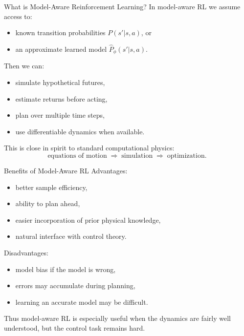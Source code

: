 \documentclass[aspectratio=169]{beamer}
\begin{document}
\begin{frame}{What is Model-Aware Reinforcement Learning?}
  In model-aware RL we assume access to:
  \begin{itemize}
  \item known transition probabilities $P(s'|s,a)$, or
  \item an approximate learned model $\hat P_\phi(s'|s,a)$.
  \end{itemize}

  Then we can:
  \begin{itemize}
  \item simulate hypothetical futures,
  \item estimate returns before acting,
  \item plan over multiple time steps,
  \item use differentiable dynamics when available.
  \end{itemize}

  This is close in spirit to standard computational physics:
  \[
  \text{equations of motion} \;\Rightarrow\; \text{simulation} \;\Rightarrow\; \text{optimization}.
  \]
\end{frame}

\begin{frame}{Benefits of Model-Aware RL}
  Advantages:
  \begin{itemize}
  \item better sample efficiency,
  \item ability to plan ahead,
  \item easier incorporation of prior physical knowledge,
  \item natural interface with control theory.
  \end{itemize}

  Disadvantages:
  \begin{itemize}
  \item model bias if the model is wrong,
  \item errors may accumulate during planning,
  \item learning an accurate model may be difficult.
  \end{itemize}

  Thus model-aware RL is especially useful when the dynamics are fairly well understood, but the control task remains hard.
\end{frame}
\end{document}
